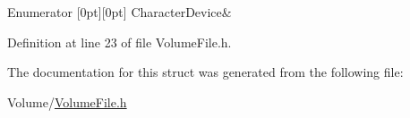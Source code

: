 \begin{DoxyEnumFields}{Enumerator}
[0pt][0pt]{}\mbox{\label{struct_gost_crypt_1_1_volume_1_1_file_type_a83c327e2ac3e4260e070028644f577f7a494f7b82bd9caf435af051b30dfdb619}} 
Character\+Device&\\
\hline

\end{DoxyEnumFields}


Definition at line 23 of file Volume\+File.\+h.



The documentation for this struct was generated from the following file\+:\begin{DoxyCompactItemize}
\item 
Volume/\hyperlink{_volume_file_8h}{Volume\+File.\+h}\end{DoxyCompactItemize}
